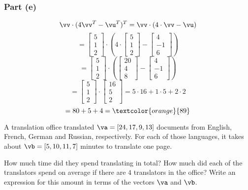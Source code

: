 \begin{sol}
    \subsubsection*{Part (e)}
    \[
    \vv \cdot (4\vv^T - \vu^T)^T = \vv \cdot (4 \cdot \vv - \vu)
    \]
    \[
    = \begin{bmatrix} 5 \\ 1 \\ 2 \end{bmatrix} \cdot \left(4 \cdot \begin{bmatrix} 5 \\ 1 \\ 2 \end{bmatrix} - \begin{bmatrix} 4 \\ -1 \\ 6 \end{bmatrix}\right)
    \]
    \[
    = \begin{bmatrix} 5 \\ 1 \\ 2 \end{bmatrix} \cdot \left(\begin{bmatrix} 20 \\ 4 \\ 8 \end{bmatrix} - \begin{bmatrix} 4 \\ -1 \\ 6 \end{bmatrix}\right)
    \]
    \[
    = \begin{bmatrix} 5 \\ 1 \\ 2 \end{bmatrix} \cdot \begin{bmatrix} 16 \\ 5 \\ 2 \end{bmatrix} = 5 \cdot 16 + 1 \cdot 5 + 2 \cdot 2
    \]
    \[
    = 80 + 5 + 4 = \textcolor{orange}{89}
    \]
\end{sol}

\medskip

\begin{problem}%
    A translation office translated $\va=[24, 17, 9, 13]$ documents from English, French, German and Russian, respectively. For each of those languages, it takes about $\vb=[5, 10, 11, 7]$ minutes to translate one page.
    
    How much time did they spend translating in total? How much did each of the translators spend on average if there are $4$ translators in the office? Write an expression for this amount in terms of the vectors $\va$ and $\vb$.
\end{problem}

